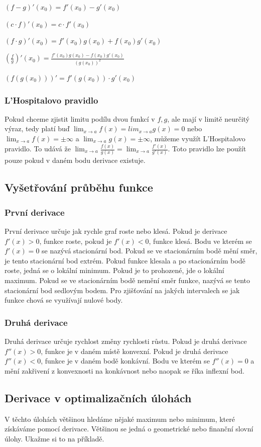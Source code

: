 \documentclass[12pt]{article}
\begin{document}
$(f-g)'(x_0) = f'(x_0) - g'(x_0)$

$(c \cdot f)'(x_0) = c \cdot f'(x_0)$

$(f \cdot g)'(x_0) = f'(x_0)g(x_0) + f(x_0)g'(x_0)$

$(\frac{f}{g})'(x_0) = \frac{f'(x_0)g(x_0) - f(x_0)g'(x_0)}{(g(x_0))^2}$

$(f(g(x_0)))' = f'(g(x_0)) \cdot g'(x_0)$
\subsubsection*{L'Hospitalovo pravidlo}
Pokud chceme zjistit limitu podílu dvou funkcí v $f, g$, ale mají v limitě neurčitý výraz, tedy platí
buď $\lim_{x \to a}f(x) = lim_{x \to
a}g(x) = 0$ nebo $\lim_{x \to a}f(x) = \pm \infty$ a $\lim_{x \to a}g(x) = \pm \infty$, můžeme využít
L'Hospitalovo pravidlo. To udává že $\lim_{x \to a} \frac{f(x)}{g(x)} = \lim_{x \to a}
\frac{f'(x)}{g'(x)}$. Toto pravidlo lze použít pouze pokud v daném bodu derivace existuje.

\subsection*{Vyšetřování průběhu funkce}
\subsubsection*{První derivace}
První derivace určuje jak rychle graf roste nebo klesá. Pokud je derivace $f'(x) > 0$, funkce roste,
pokud je $f'(x) < 0$, funkce klesá. Bodu ve kterém se $f'(x) = 0$ se nazývá stacionární bod. Pokud
se ve stacionárním bodě mění směr, je tento stacionární bod extrém. Pokud funkce klesala a po
stacionárním bodě roste, jedná se o lokální minimum. Pokud je to prohozené, jde o lokální maximum.
Pokud se ve stacionárním bodě nemění směr funkce, nazývá se tento stacionární bod sedlovým bodem.
Pro zjišťování na jakých intervalech se jak funkce chová se využívají nulové body.
\subsubsection*{Druhá derivace}
Druhá derivace určuje rychlost změny rychlosti růstu. Pokud je druhá derivace $f''(x) > 0$, funkce
je v daném místě konvexní. Pokud je druhá derivace $f''(x) < 0$, funkce je v daném bodě konkávní.
Bodu ve kterém se $f''(x) = 0$ a mění zakřivení z konvexnosti na konkávnost nebo naopak se říka
inflexní bod.
\subsection*{Derivace v optimalizačních úlohách}
V těchto úlohách většinou hledáme nějaké maximum nebo minimum, které získáváme pomocí derivace.
Většinou se jedná o geometrické nebo finanční slovní úlohy. Ukažme si to na příkladě.
\end{document}
